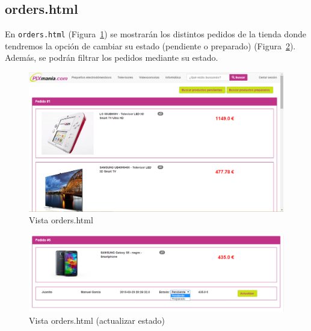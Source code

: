\documentclass[12pt,a4paper,svgnames]{article}
\begin{document}
\clearpage

\subsection{orders.html}
En \texttt{orders.html} (Figura~\ref{fig:orders}) se mostrarán los distintos pedidos de la tienda donde tendremos la opción de cambiar su estado (pendiente o preparado) (Figura~\ref{fig:orders_actualizar_estado}). Además, se podrán filtrar los pedidos mediante su estado.

\begin{figure}[htbp]
	\centering
	\includegraphics[width=1\linewidth]{imagenes/orders}
	\caption{Vista orders.html}
	\label{fig:orders}
\end{figure}

\begin{figure}[htbp]
	\centering
	\includegraphics[width=1\linewidth]{imagenes/orders_actualizar_estado}
	\caption{Vista orders.html (actualizar estado)}
	\label{fig:orders_actualizar_estado}
\end{figure}
\end{document}
